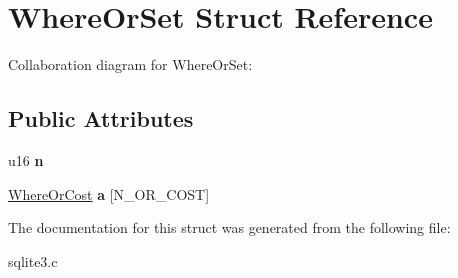 \hypertarget{structWhereOrSet}{}\section{Where\+Or\+Set Struct Reference}
\label{structWhereOrSet}


Collaboration diagram for Where\+Or\+Set\+:
\subsection*{Public Attributes}
\begin{DoxyCompactItemize}
\item 
u16 {\bfseries n}\hypertarget{structWhereOrSet_ac5fce5cb06eb3e01a77efe6643acd618}{}\label{structWhereOrSet_ac5fce5cb06eb3e01a77efe6643acd618}

\item 
\hyperlink{structWhereOrCost}{Where\+Or\+Cost} {\bfseries a} \mbox{[}N\+\_\+\+O\+R\+\_\+\+C\+O\+ST\mbox{]}\hypertarget{structWhereOrSet_a2e78a14bf6f34f266a2ae2d046c7ba80}{}\label{structWhereOrSet_a2e78a14bf6f34f266a2ae2d046c7ba80}

\end{DoxyCompactItemize}


The documentation for this struct was generated from the following file\+:\begin{DoxyCompactItemize}
\item 
sqlite3.\+c\end{DoxyCompactItemize}

